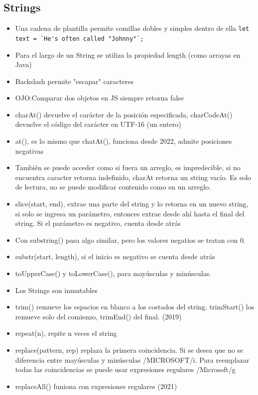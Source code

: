 \documentclass{article}
\begin{document}
 \subsection{Strings}
 \begin{itemize}
   \item Una cadena de plantilla permite comillas dobles y simples dentro de ella \lstinline{let text = `He's often called "Johnny"`;}
   \item Para el largo de un String se utiliza la propiedad length (como arrayas en Java)
   \item Backslash permite "escapar" caracteres
   \item OJO:Comparar dos objetos en JS siempre retorna false
   \item charAt() devuelve el carácter  de la posición especificada, charCodeAt() devuelve el código del carácter en UTF-16 (un entero)
   \item at(), es lo mismo que chatAt(), funciona desde 2022, admite posiciones negativas
   \item También se puede acceder como si fuera un arreglo, es impredecible, si no encuentra caracter retorna indefinido, charAt retorna un string vacío. Es solo de lectura, no se puede modificar contenido como en un arreglo.
   \item slice(start, end), extrae una parte del string y lo retorna en un nuevo string, si solo se ingresa un parámetro, entonces extrae desde ahí hasta el final del string. Si el parámetro es negativo, cuenta desde atrás
   \item Con substring() pasa algo similar, pero los valores negatios se tratan con 0.
   \item substr(start, length), si el inicio es negativo se cuenta desde atrás
   \item toUpperCase() y toLowerCase(), para mayúsculas y minúsculas.
   \item Los Strings son inmutables
   \item trim() remueve los espacios en blanco a los costados del string. trimStart() los remueve solo del comienzo, trimEnd() del final. (2019)
   \item repeat(n), repite n veces el string
   \item replace(pattern, rep) replaza la primera coincidencia. Si se desea que no se diferencia entre mayúsculas y minúsculas /MICROSOFT/i. Para reemplazar todas las coincidencias se puede usar expresiones regulares /Microsoft/g
   \item replaceAll() funiona con expresiones regulares (2021)

\end{itemize}
\end{document}
